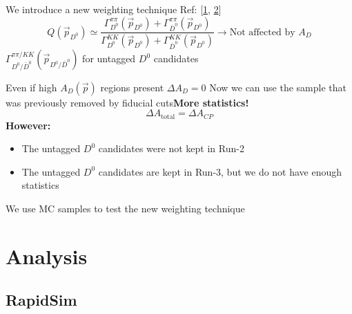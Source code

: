 \documentclass{beamer}
\begin{document}
\begin{frame}
      \frametitle{\insertsubsectionhead}
      \rightarrow We introduce a new weighting technique Ref: [\href{https://indico.cern.ch/event/780618/\#-update-of-delta-a_cp-to-the}{1}, \href{https://groups.cern.ch/group/lhcb-phys-charm/Lists/Archive/Flat.aspx?RootFolder=/group/lhcb-phys-charm/Lists/Archive/Some\%20thoughts\%20on\%20DeltaACP&FolderCTID=0x012002009FBA6738F0FB684B8D8EB7AE0A048769}{2}]
      \begin{equation*}
            Q(\vec{p}_{D^0}) \simeq \frac{\Gamma_{D^0}^{\pi\pi}(\vec{p}_{D^0}) + \Gamma_{\bar{D}^0}^{\pi\pi}(\vec{p}_{D^0})}{\Gamma_{D^0}^{KK}(\vec{p}_{D^0}) + \Gamma_{\bar{D}^0}^{KK}(\vec{p}_{D^0})}\to \text{Not affected by }A_D
      \end{equation*}
      \rightarrow $\Gamma_{D^0/\bar{D}^0}^{\pi\pi/ KK}(\vec{p}_{D^0/\bar{D}^0})$ for untagged $D^0$ candidates

      \rightarrow Even if high $A_D(\vec{p})$ regions present $\Delta A_D = 0$
      \bigbreak
      \rightarrow Now we can use the sample that was previously removed by fiducial cuts\Rightarrow \textbf{More statistics!}
      \begin{equation*}
            \boxed{\Delta A_\text{total} = \Delta A_{CP}}
      \end{equation*}
      {\bf However:}
      \begin{itemize}
            \item The untagged $D^0$ candidates were not kept in Run-2
            \item The untagged $D^0$ candidates are kept in Run-3, but we do not have enough statistics
      \end{itemize}
      \rightarrow We use MC samples to test the new weighting technique
\end{frame}

\section{Analysis}
\subsection{RapidSim}
\end{document}
